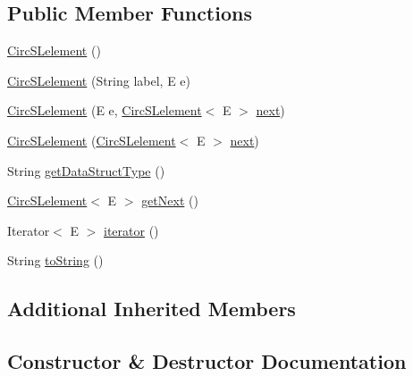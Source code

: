 \subsection*{Public Member Functions}
\begin{DoxyCompactItemize}
\item 
\hyperlink{classbridges_1_1base_1_1_circ_s_lelement_a4a5a58cc7a0ec5170a828861c11df1b3}{Circ\+S\+Lelement} ()
\item 
\hyperlink{classbridges_1_1base_1_1_circ_s_lelement_a213d61713e51295d756669def911f080}{Circ\+S\+Lelement} (String label, E e)
\item 
\hyperlink{classbridges_1_1base_1_1_circ_s_lelement_ada65c593c8af7e6ed96fcdf12c26824f}{Circ\+S\+Lelement} (E e, \hyperlink{classbridges_1_1base_1_1_circ_s_lelement}{Circ\+S\+Lelement}$<$ E $>$ \hyperlink{classbridges_1_1base_1_1_s_lelement_abf61c96a74ad319d561c6952ea388e0e}{next})
\item 
\hyperlink{classbridges_1_1base_1_1_circ_s_lelement_ab9e5b98e8d917760b9651a52785358b9}{Circ\+S\+Lelement} (\hyperlink{classbridges_1_1base_1_1_circ_s_lelement}{Circ\+S\+Lelement}$<$ E $>$ \hyperlink{classbridges_1_1base_1_1_s_lelement_abf61c96a74ad319d561c6952ea388e0e}{next})
\item 
String \hyperlink{classbridges_1_1base_1_1_circ_s_lelement_ad56acddc52e8e0b6869a6f24f1e0a90e}{get\+Data\+Struct\+Type} ()
\item 
\hyperlink{classbridges_1_1base_1_1_circ_s_lelement}{Circ\+S\+Lelement}$<$ E $>$ \hyperlink{classbridges_1_1base_1_1_circ_s_lelement_ae18b07e3f1d37b5eca0cae22efc0d395}{get\+Next} ()
\item 
Iterator$<$ E $>$ \hyperlink{classbridges_1_1base_1_1_circ_s_lelement_a17113bdda16d92021aaa29186786848f}{iterator} ()
\item 
String \hyperlink{classbridges_1_1base_1_1_circ_s_lelement_af307188926766e73efb988f102ce9740}{to\+String} ()
\end{DoxyCompactItemize}
\subsection*{Additional Inherited Members}


\subsection{Constructor \& Destructor Documentation}
\mbox{\label{classbridges_1_1base_1_1_circ_s_lelement_a4a5a58cc7a0ec5170a828861c11df1b3}} 
